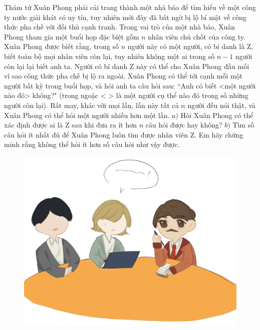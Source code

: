 \begin{multicols}{2}
	Thám tử Xuân Phong phải cải trang thành một nhà báo để tìm hiểu về một công ty nước giải khát có uy tín, tuy nhiên mới đây đã bất ngờ bị lộ bí mật về công thức pha chế với đối thủ cạnh tranh. Trong vai trò của một nhà báo, Xuân Phong tham gia một buổi họp đặc biệt gồm $n$ nhân viên chủ chốt của công ty. Xuân Phong được biết rằng, trong số $n$ người này có một người, có bí danh là Z, biết toàn bộ mọi nhân viên còn lại, tuy nhiên không một ai trong số $n-1$ người còn lại lại biết anh ta. Người có bí danh Z này có thể cho Xuân Phong đầu mối vì sao công thức pha chế bị lộ ra ngoài.
	\vskip 0.1cm
	Xuân Phong có thể tới cạnh mỗi một người bất kỳ trong buổi họp, và hỏi anh ta câu hỏi sau: ``Anh có biết <một người nào đó> không?" (trong ngoặc < > là một người cụ thể nào đó trong số những người còn lại). Rất may, khác với mọi lần, lần này  tất cả $n$ người đều nói thật, và Xuân Phong có thể hỏi một người nhiều hơn một lần.
	\vskip 0.1cm
	$a)$ Hỏi Xuân Phong có thể xác định được ai là Z sau khi đưa ra ít hơn $n$ câu hỏi được hay không?
	\vskip 0.1cm
	$b)$ Tìm số câu hỏi ít nhất đủ để Xuân Phong luôn tìm được nhân viên Z. Em hãy chứng minh rằng không thể hỏi ít hơn số câu hỏi như vậy được.
	
	\begin{figure}[H]
		\centering
		\vspace*{-5pt}
		\captionsetup{labelformat= empty, justification=centering}
		\includegraphics[width=1\linewidth]{xp}
		\vspace*{-15pt}
	\end{figure}
\end{multicols}
